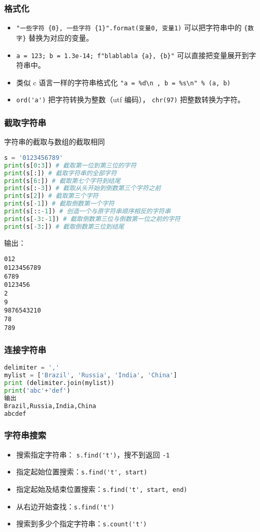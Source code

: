 \subsubsection{格式化}
\begin{itemize}
\item \verb`"一些字符 {0}, 一些字符 {1}".format(变量0, 变量1)` 可以把字符串中的 \verb`{数字}` 替换为对应的变量。
\item \verb`a = 123; b = 1.3e-14; f"blablabla {a}, {b}"` 可以直接把变量展开到字符串中。
\item 类似 c 语言一样的字符串格式化 \verb`"a = %d\n , b = %s\n" % (a, b)`
\item \verb`ord('a')` 把字符转换为整数（utf 编码）， \verb`chr(97)` 把整数转换为字符。
\end{itemize}


\subsubsection{截取字符串}
字符串的截取与数组的截取相同
\begin{lstlisting}[language=python]
s = '0123456789'
print(s[0:3]) # 截取第一位到第三位的字符
print(s[:]) # 截取字符串的全部字符
print(s[6:]) # 截取第七个字符到结尾
print(s[:-3]) # 截取从头开始到倒数第三个字符之前
print(s[2]) # 截取第三个字符
print(s[-1]) # 截取倒数第一个字符
print(s[::-1]) # 创造一个与原字符串顺序相反的字符串
print(s[-3:-1]) # 截取倒数第三位与倒数第一位之前的字符
print(s[-3:]) # 截取倒数第三位到结尾
\end{lstlisting}
输出：
\begin{lstlisting}[language=none]
012
0123456789
6789
0123456
2
9
9876543210
78
789
\end{lstlisting}

\subsubsection{连接字符串}
\begin{lstlisting}[language=python]
delimiter = ','
mylist = ['Brazil', 'Russia', 'India', 'China']
print (delimiter.join(mylist))
print('abc'+'def')
输出
Brazil,Russia,India,China
abcdef
\end{lstlisting}

\subsubsection{字符串搜索}
\begin{itemize}
\item 搜索指定字符串： \verb`s.find('t')`，搜不到返回 \verb`-1`
\item 指定起始位置搜索：\verb`s.find('t', start)`
\item 指定起始及结束位置搜索：\verb`s.find('t', start, end)`
\item 从右边开始查找：\verb`s.find('t')`
\item 搜索到多少个指定字符串：\verb`s.count('t')`
\end{itemize}

